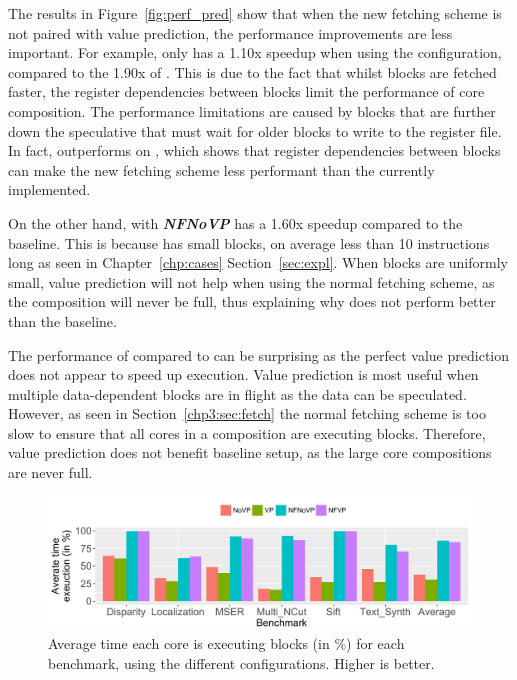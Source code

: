 The results in Figure~\ref{fig:perf_pred} show that when the new fetching scheme is not paired with value prediction, the performance improvements are less important.
For example,  only has a 1.10x speedup when using the \nfnovp{} configuration, compared to the 1.90x of \nfvp{}.
This is due to the fact that whilst blocks are fetched faster, the register dependencies between blocks limit the performance of core composition.
The performance limitations are caused by blocks that are further down the speculative that must wait for older blocks to write to the register file.
In fact, \vp{} outperforms \nfnovp{} on , which shows that register dependencies between blocks can make the new fetching scheme less performant than the currently implemented.

On the other hand,  with \textbf{\textit{NFNoVP}} has a 1.60x speedup compared to the baseline.
This is because  has small blocks, on average less than 10 instructions long as seen in Chapter~\ref{chp:cases} Section~\ref{sec:expl}.
When blocks are uniformly small, value prediction will not help when using the normal fetching scheme, as the composition will never be full, thus explaining why \vp{} does not perform better than the baseline.

The performance of \vp{} compared to \novp{} can be surprising as the perfect value prediction does not appear to speed up execution.
Value prediction is most useful when multiple data-dependent blocks are in flight as the data can be speculated.
However, as seen in Section~\ref{chp3:sec:fetch} the normal fetching scheme is too slow to ensure that all cores in a composition are executing blocks.
Therefore, value prediction does not benefit baseline setup, as the large core compositions are never full.

\begin{figure}[t]
    \centering
    \includegraphics[width=1\textwidth]{chapter3/graphics/perf_av_cycle_exec.pdf}
    \caption{Average time each core is executing blocks (in \%) for each benchmark, using the different configurations. Higher is better.}
    \label{fig:perf_av_cycle}
	\vspace{1em}
\end{figure}

